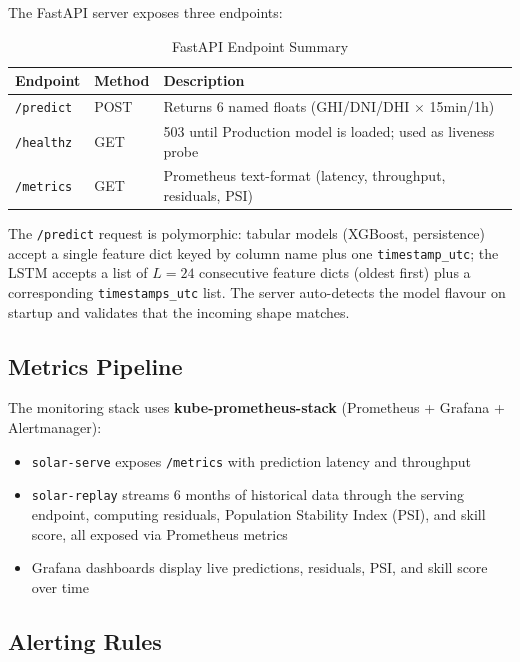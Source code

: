 \documentclass[11pt,a4paper]{article}
\begin{document}
The FastAPI server exposes three endpoints:

\begin{table}[H]
\centering
\small
\begin{tabular}{@{}lll@{}}
\toprule
\textbf{Endpoint} & \textbf{Method} & \textbf{Description} \\
\midrule
\texttt{/predict} & POST & Returns 6 named floats (GHI/DNI/DHI $\times$ 15min/1h) \\
\texttt{/healthz} & GET  & 503 until Production model is loaded; used as liveness probe \\
\texttt{/metrics} & GET  & Prometheus text-format (latency, throughput, residuals, PSI) \\
\bottomrule
\end{tabular}
\caption{FastAPI Endpoint Summary}
\label{tab:endpoints}
\end{table}

The \texttt{/predict} request is polymorphic: tabular models (XGBoost, persistence) accept a single feature dict keyed by column name plus one \texttt{timestamp\_utc}; the LSTM accepts a list of $L = 24$ consecutive feature dicts (oldest first) plus a corresponding \texttt{timestamps\_utc} list. The server auto-detects the model flavour on startup and validates that the incoming shape matches.

\subsection{Metrics Pipeline}

The monitoring stack uses \textbf{kube-prometheus-stack} (Prometheus + Grafana + Alertmanager):

\begin{itemize}
    \item \texttt{solar-serve} exposes \texttt{/metrics} with prediction latency and throughput
    \item \texttt{solar-replay} streams 6 months of historical data through the serving endpoint, computing residuals, Population Stability Index (PSI), and skill score, all exposed via Prometheus metrics
    \item Grafana dashboards display live predictions, residuals, PSI, and skill score over time
\end{itemize}

\subsection{Alerting Rules}
\end{document}
